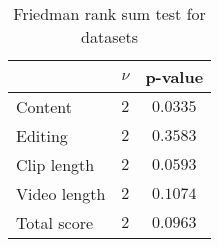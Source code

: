 \begin{table}[ht]
	\begin{center}
	\caption{Friedman rank sum test for datasets}
	\label{tab:fried_dataset}
		\begin{tabular}{lcc}
		\toprule
			 & $\nu$ & p-value\\
			\midrule
			Content & $2$ & $0.0335$\\
			Editing & $2$ & $0.3583$\\
			Clip length & $2$ & $0.0593$\\
			Video length & $2$ & $0.1074$\\
			Total score & $2$ & $0.0963$\\
		\bottomrule
		\end{tabular}
	\end{center}
\end{table}